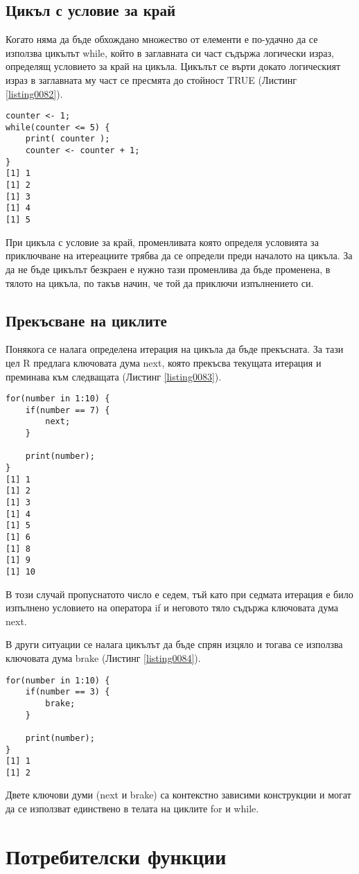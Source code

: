 \subsection{Цикъл с условие за край}

Когато няма да бъде обхождано множество от елементи е по-удачно да се използва цикълът while, който в заглавната си част съдържа логически израз, определящ условието за край на цикъла. Цикълът се върти докато логическият израз в заглавната му част се пресмята до стойност TRUE (Листинг \ref{listing0082}). 

\begin{lstlisting}[caption=Цикъл с условие за край, label=listing0082]
counter <- 1;
while(counter <= 5) { 
	print( counter ); 
	counter <- counter + 1;
}
[1] 1
[1] 2
[1] 3
[1] 4
[1] 5
\end{lstlisting}

При цикъла с условие за край, променливата която определя условията за приключване на итереациите трябва да се определи преди началото на цикъла. За да не бъде цикълът безкраен е нужно тази променлива да бъде променена, в тялото на цикъла, по такъв начин, че той да приключи изпълнението си.

\subsection{Прекъсване на циклите}

Понякога се налага определена итерация на цикъла да бъде прекъсната. За тази цел R предлага ключовата дума next, която прекъсва текущата итерация и преминава към следващата (Листинг \ref{listing0083}).

\begin{lstlisting}[caption=Прекъсване на итерация, label=listing0083]
for(number in 1:10) { 
	if(number == 7) {
		next;
	}

	print(number);
}
[1] 1
[1] 2
[1] 3
[1] 4
[1] 5
[1] 6
[1] 8
[1] 9
[1] 10
\end{lstlisting}

В този случай пропуснатото число е седем, тъй като при седмата итерация е било изпълнено условието на оператора if и неговото тяло съдържа ключовата дума next.


В други ситуации се налага цикълът да бъде спрян изцяло и тогава се използва ключовата дума brake (Листинг \ref{listing0084}).

\begin{lstlisting}[caption=Прекъсване на цикъла, label=listing0084]
for(number in 1:10) { 
	if(number == 3) {
		brake;
	}

	print(number);
}
[1] 1
[1] 2
\end{lstlisting}

Двете ключови думи (next и brake) са контекстно зависими конструкции и могат да се използват единствено в телата на циклите for и while. 

\section{Потребителски функции}


